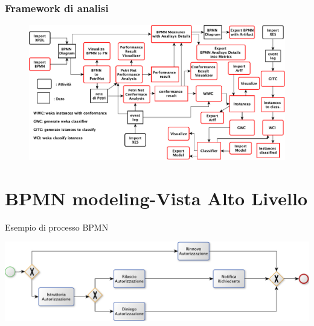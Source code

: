 \documentclass[10pt]{beamer}
\begin{document}
	
	\begin{frame}
	\frametitle{Framework di analisi}
	\begin{figure}
	\centering 
	\includegraphics[scale=0.60]{./fig/PromPlugin_pres}
	\end{figure}
	\end{frame}
	
	

	\section{BPMN modeling-Vista Alto Livello}
	\begin{frame}{Esempio di processo BPMN}
	    \begin{center}
	    \includegraphics[scale=0.50]{./fig/BPMN_AltoL}
	  \end{center}
	\end{frame}
	
\end{document}
